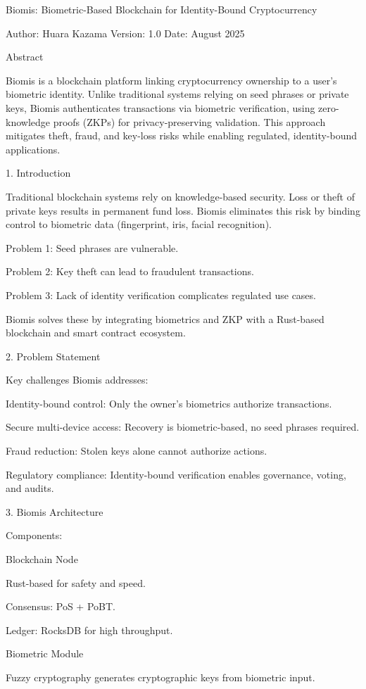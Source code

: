 Biomis: Biometric-Based Blockchain for Identity-Bound Cryptocurrency

Author: Huara Kazama
Version: 1.0
Date: August 2025

Abstract

Biomis is a blockchain platform linking cryptocurrency ownership to a user’s biometric identity. Unlike traditional systems relying on seed phrases or private keys, Biomis authenticates transactions via biometric verification, using zero-knowledge proofs (ZKPs) for privacy-preserving validation. This approach mitigates theft, fraud, and key-loss risks while enabling regulated, identity-bound applications.

1. Introduction

Traditional blockchain systems rely on knowledge-based security. Loss or theft of private keys results in permanent fund loss. Biomis eliminates this risk by binding control to biometric data (fingerprint, iris, facial recognition).

Problem 1: Seed phrases are vulnerable.

Problem 2: Key theft can lead to fraudulent transactions.

Problem 3: Lack of identity verification complicates regulated use cases.

Biomis solves these by integrating biometrics and ZKP with a Rust-based blockchain and smart contract ecosystem.

2. Problem Statement

Key challenges Biomis addresses:

Identity-bound control: Only the owner’s biometrics authorize transactions.

Secure multi-device access: Recovery is biometric-based, no seed phrases required.

Fraud reduction: Stolen keys alone cannot authorize actions.

Regulatory compliance: Identity-bound verification enables governance, voting, and audits.

3. Biomis Architecture

Components:

Blockchain Node

Rust-based for safety and speed.

Consensus: PoS + PoBT.

Ledger: RocksDB for high throughput.

Biometric Module

Fuzzy cryptography generates cryptographic keys from biometric input.

